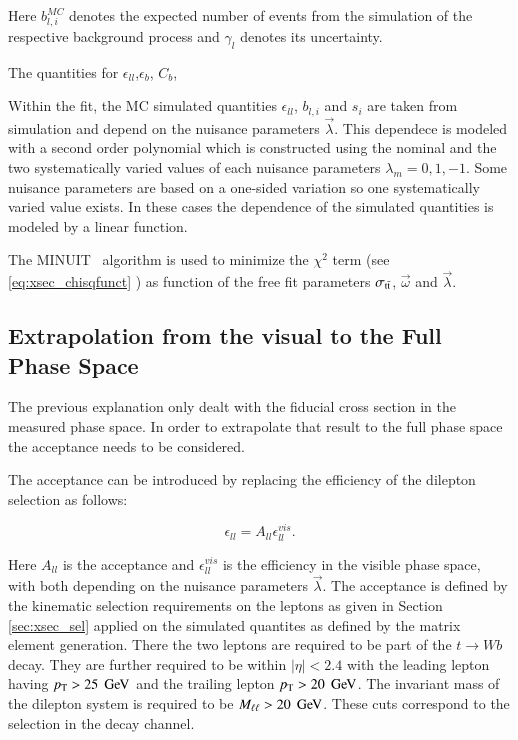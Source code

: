 Here $b_{l,i}^{MC}$ denotes the expected number of events from the simulation of the respective background process and $\gamma_l$ denotes its uncertainty.

The quantities for $\epsilon_{ll}$,$\epsilon_b$, $C_b$, 

Within the fit, the MC simulated quantities $\epsilon_{ll}$, $b_{l,i}$ and $s_{i}$ are taken from simulation and depend on the nuisance parameters $\vec{\lambda}$.
This dependece is modeled with a second order polynomial which is constructed using the nominal and the two systematically varied values of each nuisance parameters $\lambda_m=0,1,-1$.
Some nuisance parameters are based on a one-sided variation so one systematically varied value exists. In these cases the dependence of the simulated quantities is modeled by a linear function.

The MINUIT~\cite{James:1975dr} algorithm is used to minimize the  $\chi^2$ term (see \ref{eq:xsec_chisqfunct} ) as function of the free fit parameters $\sigma_\mathrm{t\bar{t}}$, $\vec{\omega}$
and $\vec{\lambda}$. 


\subsection{Extrapolation from the visual to the Full Phase Space}
\label{sec:xsec_extraction}

The previous explanation only dealt with the fiducial cross section in the measured phase space. In order to extrapolate that result to the full phase space the acceptance
needs to be considered.

The acceptance can be introduced by replacing the efficiency of the dilepton selection as follows:

\begin{equation}
\epsilon_{ll} = A_{ll} \epsilon^{vis}_{ll}.
\label{eq:epsacc}
\end{equation}

Here $A_{ll}$ is the acceptance and $\epsilon^{vis}_{ll}$ is the efficiency in the visible phase space, with both depending on the nuisance parameters $\vec{\lambda}$.
The acceptance is defined by the kinematic selection requirements on the leptons as given in Section \ref{sec:xsec_sel} applied on the simulated quantites as defined by the 
matrix element generation. There the two leptons are required to be part of the $t \rightarrow W b$ decay. They are further required to be within $|\eta|< 2.4$ with the 
leading lepton having $p_{\mathrm{T}} > 25 \; \,\text{Ge\hspace{-.08em}V}$ and the trailing lepton $p_{\mathrm{T}} > 20 \; \,\text{Ge\hspace{-.08em}V}$. The invariant mass of the dilepton system is required to be $M_{\ell\ell} > 20 \; \,\text{Ge\hspace{-.08em}V}$.
These cuts correspond to the selection in the \emu decay channel.



